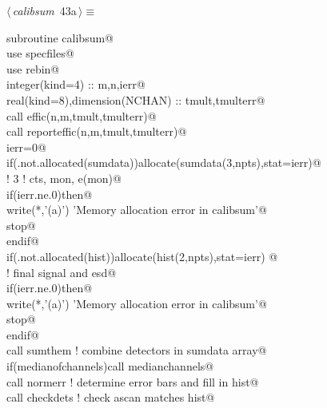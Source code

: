 \documentclass[10pt,a4paper,notitlepage]{article}
\begin{document}
\begin{flushleft} \small
\begin{minipage}{\linewidth}\label{scrap46}\raggedright\small
{} $\langle\,${\it calibsum}\nobreak\ {\footnotesize {43a}}$\,\rangle\equiv$
\vspace{-1ex}
\begin{list}{}{} \item
\mbox{}\verb@      subroutine calibsum@\\
\mbox{}\verb@      use specfiles@\\
\mbox{}\verb@      use rebin@\\
\mbox{}\verb@      integer(kind=4) :: m,n,ierr@\\
\mbox{}\verb@      real(kind=8),dimension(NCHAN) :: tmult,tmulterr@\\
\mbox{}\verb@      call effic(n,m,tmult,tmulterr)@\\
\mbox{}\verb@      call reporteffic(n,m,tmult,tmulterr)@\\
\mbox{}\verb@      ierr=0@\\
\mbox{}\verb@      if(.not.allocated(sumdata))allocate(sumdata(3,npts),stat=ierr)@\\
\mbox{}\verb@! 3 ! cts, mon, e(mon)@\\
\mbox{}\verb@      if(ierr.ne.0)then@\\
\mbox{}\verb@       write(*,'(a)') 'Memory allocation error in calibsum'@\\
\mbox{}\verb@       stop@\\
\mbox{}\verb@      endif@\\
\mbox{}\verb@      if(.not.allocated(hist))allocate(hist(2,npts),stat=ierr) @\\
\mbox{}\verb@! final signal and esd@\\
\mbox{}\verb@      if(ierr.ne.0)then@\\
\mbox{}\verb@       write(*,'(a)') 'Memory allocation error in calibsum'@\\
\mbox{}\verb@       stop@\\
\mbox{}\verb@      endif@\\
\mbox{}\verb@      call sumthem      ! combine detectors in sumdata array@\\
\mbox{}\verb@      if(medianofchannels)call medianchannels@\\
\mbox{}\verb@      call normerr      ! determine error bars and fill in hist@\\
\mbox{}\verb@      call checkdets    ! check ascan matches hist@\\

\end{list}
\end{minipage}
\end{flushleft}
\end{document}
